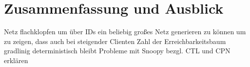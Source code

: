 \section{Zusammenfassung und Ausblick} 
Netz flachklopfen um über IDs ein beliebig großes Netz generieren zu können um zu zeigen, dass auch bei steigender Clienten Zahl der Erreichbarkeitsbaum gradlinig deterministisch bleibt
Probleme mit Snoopy bezgl. CTL und CPN erklären